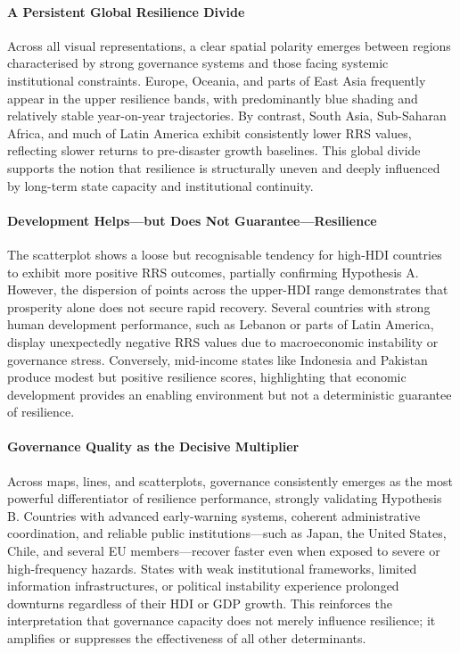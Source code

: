 \documentclass[conference]{IEEEtran}
\begin{document}
\paragraph{A Persistent Global Resilience Divide}
Across all visual representations, a clear spatial polarity emerges between regions characterised by strong governance systems and those facing systemic institutional constraints. Europe, Oceania, and parts of East Asia frequently appear in the upper resilience bands, with predominantly blue shading and relatively stable year-on-year trajectories. By contrast, South Asia, Sub-Saharan Africa, and much of Latin America exhibit consistently lower RRS values, reflecting slower returns to pre-disaster growth baselines. This global divide supports the notion that resilience is structurally uneven and deeply influenced by long-term state capacity and institutional continuity.

\paragraph{Development Helps—but Does Not Guarantee—Resilience}
The scatterplot shows a loose but recognisable tendency for high-HDI countries to exhibit more positive RRS outcomes, partially confirming Hypothesis A. However, the dispersion of points across the upper-HDI range demonstrates that prosperity alone does not secure rapid recovery. Several countries with strong human development performance, such as Lebanon or parts of Latin America, display unexpectedly negative RRS values due to macroeconomic instability or governance stress. Conversely, mid-income states like Indonesia and Pakistan produce modest but positive resilience scores, highlighting that economic development provides an enabling environment but not a deterministic guarantee of resilience.

\paragraph{Governance Quality as the Decisive Multiplier}
Across maps, lines, and scatterplots, governance consistently emerges as the most powerful differentiator of resilience performance, strongly validating Hypothesis B. Countries with advanced early-warning systems, coherent administrative coordination, and reliable public institutions—such as Japan, the United States, Chile, and several EU members—recover faster even when exposed to severe or high-frequency hazards. States with weak institutional frameworks, limited information infrastructures, or political instability experience prolonged downturns regardless of their HDI or GDP growth. This reinforces the interpretation that governance capacity does not merely influence resilience; it amplifies or suppresses the effectiveness of all other determinants.
\end{document}
